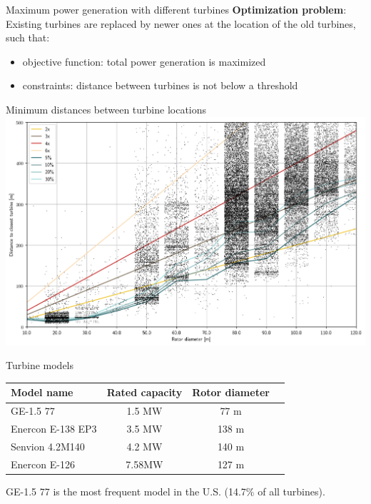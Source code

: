 \documentclass[color=usenames,dvipsnames]{beamer}
\begin{document}
    \begin{frame}{Maximum power generation with different turbines}
        \textbf{Optimization problem}:\\
        \bigskip
        Existing turbines are replaced by newer ones at the location of the old
        turbines, such that:\\
        \begin{itemize}
            \item objective function: total power generation is maximized
            \item constraints: distance between turbines is not below a threshold
        \end{itemize}
    \end{frame}

    \begin{frame}{Minimum distances between turbine locations}
        \includegraphics[width=\textwidth]{../../figures/min_distances_between_turbines.png}
    \end{frame}

    \begin{frame}{Turbine models}
        \begin{center}
            \begin{tabular}{| l | c | c | l }
                \hline
                \bfseries{Model name} & \bfseries{Rated capacity} & \bfseries{Rotor diameter}\\
                \hline
                GE-1.5 77 & 1.5 MW & 77 m\\
                \hline
                Enercon E-138 EP3 & 3.5 MW & 138 m\\
                \hline
                Senvion 4.2M140 & 4.2 MW & 140 m\\
                \hline
                Enercon E-126 & 7.58MW & 127 m\\
                \hline
            \end{tabular}
        \end{center}

        \bigskip

        GE-1.5 77 is the most frequent model in the U.S. (14.7\% of all turbines).

    \end{frame}
\end{document}
